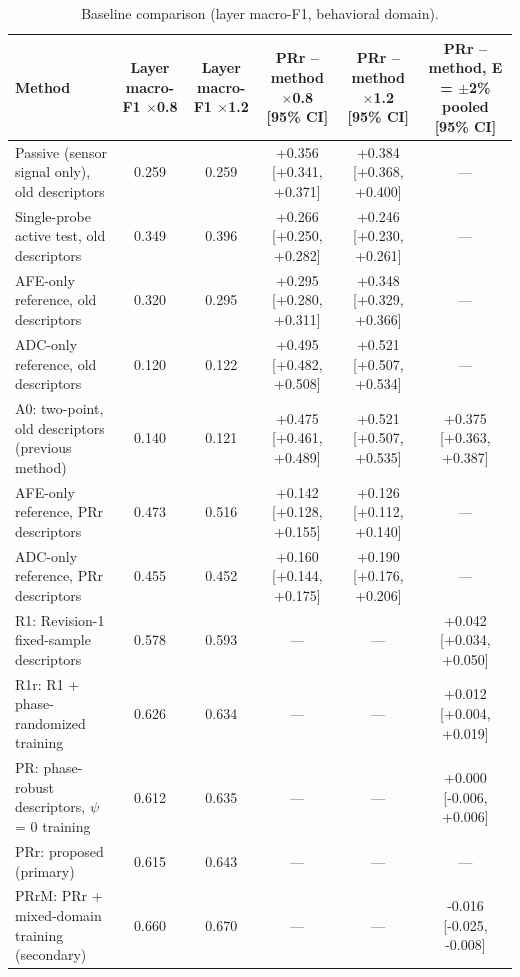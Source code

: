 \begin{table}[H]
\caption{Baseline comparison (layer macro-F1, behavioral domain).\label{tab:table06_baselines}}
\centering
\small
\begin{tabular}{lccccc}
\toprule
\textbf{Method} & \textbf{Layer macro-F1 $\times$0.8} & \textbf{Layer macro-F1 $\times$1.2} & \textbf{PRr -- method $\times$0.8 [95\% CI]} & \textbf{PRr -- method $\times$1.2 [95\% CI]} & \textbf{PRr -- method, E = $\pm$2\% pooled [95\% CI]} \\
\midrule
Passive (sensor signal only), old descriptors & 0.259 & 0.259 & +0.356 [+0.341, +0.371] & +0.384 [+0.368, +0.400] & --- \\
Single-probe active test, old descriptors & 0.349 & 0.396 & +0.266 [+0.250, +0.282] & +0.246 [+0.230, +0.261] & --- \\
AFE-only reference, old descriptors & 0.320 & 0.295 & +0.295 [+0.280, +0.311] & +0.348 [+0.329, +0.366] & --- \\
ADC-only reference, old descriptors & 0.120 & 0.122 & +0.495 [+0.482, +0.508] & +0.521 [+0.507, +0.534] & --- \\
A0: two-point, old descriptors (previous method) & 0.140 & 0.121 & +0.475 [+0.461, +0.489] & +0.521 [+0.507, +0.535] & +0.375 [+0.363, +0.387] \\
AFE-only reference, PRr descriptors & 0.473 & 0.516 & +0.142 [+0.128, +0.155] & +0.126 [+0.112, +0.140] & --- \\
ADC-only reference, PRr descriptors & 0.455 & 0.452 & +0.160 [+0.144, +0.175] & +0.190 [+0.176, +0.206] & --- \\
R1: Revision-1 fixed-sample descriptors & 0.578 & 0.593 & --- & --- & +0.042 [+0.034, +0.050] \\
R1r: R1 + phase-randomized training & 0.626 & 0.634 & --- & --- & +0.012 [+0.004, +0.019] \\
PR: phase-robust descriptors, $\psi$ = 0 training & 0.612 & 0.635 & --- & --- & +0.000 [-0.006, +0.006] \\
PRr: proposed (primary) & 0.615 & 0.643 & --- & --- & --- \\
PRrM: PRr + mixed-domain training (secondary) & 0.660 & 0.670 & --- & --- & -0.016 [-0.025, -0.008] \\
\bottomrule
\end{tabular}
\par\vspace{2pt}
\end{table}

